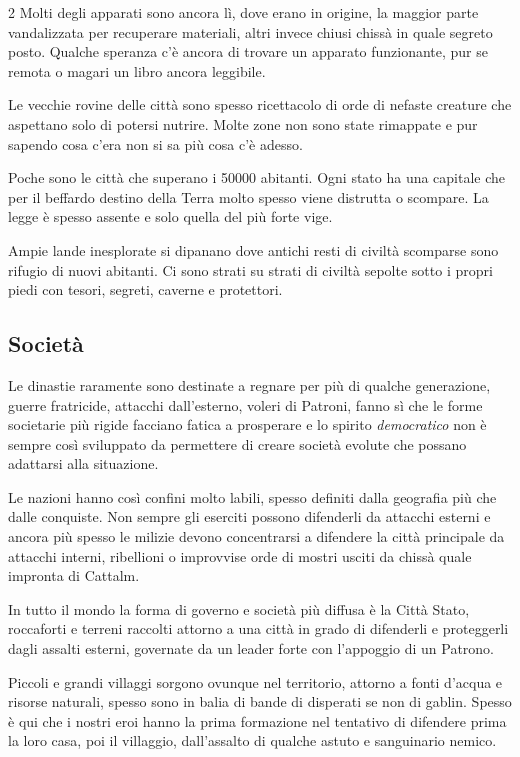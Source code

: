 \begin{multicols}{2}
Molti degli apparati sono ancora lì, dove erano in origine, la maggior parte vandalizzata per recuperare materiali, altri invece chiusi chissà in quale segreto posto. Qualche speranza c'è ancora di trovare un apparato funzionante, pur se remota o magari un libro ancora leggibile.

Le vecchie rovine delle città sono spesso ricettacolo di orde di nefaste creature che aspettano solo di potersi nutrire. Molte zone non sono state rimappate e pur sapendo cosa c'era non si sa più cosa c'è adesso.

Poche sono le città che superano i 50000 abitanti. Ogni stato ha una capitale che per il beffardo destino della Terra molto spesso viene distrutta o scompare. La legge è spesso assente e solo quella del più forte vige.

Ampie lande inesplorate si dipanano dove antichi resti di civiltà scomparse sono rifugio di nuovi abitanti. Ci sono strati su strati di civiltà sepolte sotto i propri piedi con tesori, segreti, caverne e protettori.

\subsection{Società}\label{societasullaterra}

Le dinastie raramente sono destinate a regnare per più di qualche generazione, guerre fratricide, attacchi dall'esterno, voleri di Patroni, fanno sì che le forme societarie più rigide facciano fatica a prosperare e lo spirito \emph{democratico} non è sempre così sviluppato da permettere di creare società evolute che possano adattarsi alla situazione.

Le nazioni hanno così confini molto labili, spesso definiti dalla geografia più che dalle conquiste. Non sempre gli eserciti possono difenderli da attacchi esterni e ancora più spesso le milizie devono concentrarsi a difendere la città principale da attacchi interni, ribellioni o improvvise orde di mostri usciti da chissà quale impronta di Cattalm.

In tutto il mondo la forma di governo e società più diffusa è la Città Stato, roccaforti e terreni raccolti attorno a una città in grado di difenderli e proteggerli dagli assalti esterni, governate da un leader forte con l'appoggio di un Patrono.

Piccoli e grandi villaggi sorgono ovunque nel territorio, attorno a fonti d'acqua e risorse naturali, spesso sono in balia di bande di disperati se non di gablin.
Spesso è qui che i nostri eroi hanno la prima formazione nel tentativo di difendere prima la loro casa, poi il villaggio, dall'assalto di qualche astuto e sanguinario nemico.


\end{multicols}
